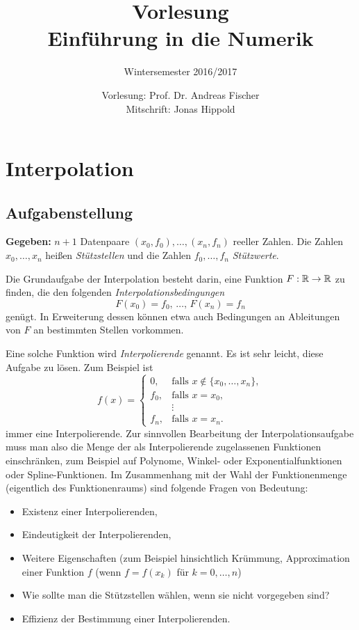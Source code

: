 \documentclass[
 a4paper,
 12pt,
 parskip=half
 ]{scrartcl}
\title{Vorlesung\\Einführung in die Numerik}
\subtitle{Wintersemester 2016/2017}
\author{Vorlesung: Prof. Dr. Andreas Fischer\\Mitschrift: Jonas Hippold}
\numberwithin{equation}{section}
\theoremstyle{plain}
\theoremstyle{definition}
\numberwithin{equation}{section}
\begin{document}
\maketitle

\tableofcontents

\section{Interpolation}
\subsection{Aufgabenstellung}
\textbf{Gegeben:} $n+1$ Datenpaare $(x_0, f_0), \ldots, (x_n,f_n)$ reeller Zahlen. Die Zahlen $x_0, \ldots, x_n$ heißen \emph{Stützstellen} und die Zahlen $f_0, \ldots, f_n$ \emph{Stützwerte}.

Die Grundaufgabe der Interpolation besteht darin, eine Funktion $F: \mathbb{R} \to \mathbb{R}$ zu finden, die den folgenden \emph{Interpolationsbedingungen}
\begin{equation}
 F(x_0) = f_0,\, \ldots,\, F(x_n) = f_n \label{eq:int_bedingung}
\end{equation}
genügt. In Erweiterung dessen können etwa auch Bedingungen an Ableitungen von $F$ an bestimmten Stellen vorkommen.

Eine solche Funktion wird \emph{Interpolierende} genannt. Es ist sehr leicht, diese Aufgabe zu lösen. Zum Beispiel ist
\[ f(x) = \begin{cases}
           0, &\text{falls } x \notin \{ x_0, \ldots, x_n \}, \\
           f_0, &\text{falls } x = x_0, \\
            &\vdots \\
           f_n, &\text{falls } x = x_n.
          \end{cases} \]
immer eine Interpolierende. Zur sinnvollen Bearbeitung der Interpolationsaufgabe muss man also die Menge der als Interpolierende zugelassenen Funktionen einschränken, zum Beispiel auf Polynome, Winkel- oder Exponentialfunktionen oder Spline-Funktionen. Im Zusammenhang mit der Wahl der Funktionenmenge (eigentlich des Funktionenraums) sind folgende Fragen von Bedeutung:
\begin{itemize}
 \item Existenz einer Interpolierenden,
 \item Eindeutigkeit der Interpolierenden,
 \item Weitere Eigenschaften (zum Beispiel hinsichtlich Krümmung, Approximation einer Funktion $f$ (wenn $f = f(x_k)$ für $k=0,\ldots,n$)
 \item Wie sollte man die Stützstellen wählen, wenn sie nicht vorgegeben sind?
 \item Effizienz der Bestimmung einer Interpolierenden.
\end{itemize}
\end{document}
